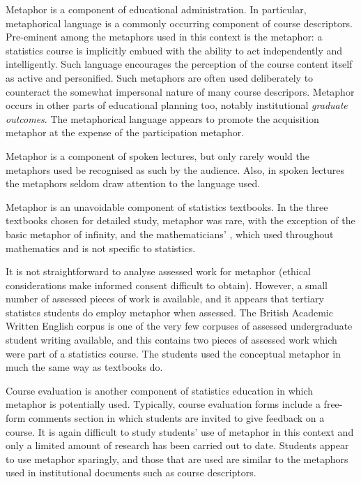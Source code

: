 Metaphor is a component of educational administration.  In particular,
metaphorical language is a commonly occurring component of course
descriptors.  Pre-eminent among the metaphors used in this context is
the  metaphor: a statistics course is implicitly
embued with the ability to act independently and intelligently.  Such
language encourages the perception of the course content itself as
active and personified.  Such metaphors are often used deliberately to
counteract the somewhat impersonal nature of many course descripors.
Metaphor occurs in other parts of educational planning too, notably
institutional \emph{graduate outcomes}.  The metaphorical language
appears to promote the acquisition metaphor at the expense of the
participation metaphor.

Metaphor is a component of spoken lectures, but only rarely would the
metaphors used be recognised as such by the audience.  Also, in spoken
lectures the metaphors seldom draw attention to the language used.

Metaphor is an unavoidable component of statistics textbooks.  In the
three textbooks chosen for detailed study, metaphor was rare, with the
exception of the basic metaphor of infinity, and the mathematicians'
, which used throughout mathematics and is not specific to
statistics.

It is not straightforward to analyse assessed work for metaphor
(ethical considerations make informed consent difficult to obtain).
However, a small number of assessed pieces of work is available, and
it appears that tertiary statistcs students do employ metaphor when
assessed.  The British Academic Written English corpus is one of the
very few corpuses of assessed undergraduate student writing available,
and this contains two pieces of assessed work which were part of a
statistics course.  The students used the conceptual metaphor
 in much the same way as textbooks do.

Course evaluation is another component of statistics education in
which metaphor is potentially used.  Typically, course evaluation
forms include a free-form comments section in which students are
invited to give feedback on a course.  It is again difficult to study
students' use of metaphor in this context and only a limited amount of
research has been carried out to date.  Students appear to use
metaphor sparingly, and those that are used are similar to the
metaphors used in institutional documents such as course descriptors.


